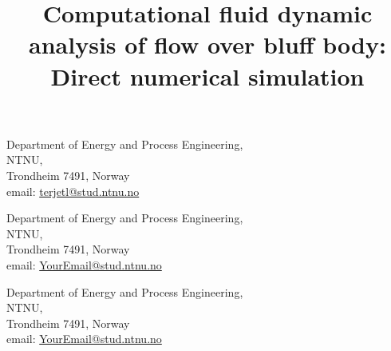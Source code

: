 \documentclass[subscriptcorrection,upint,varvw,mathalfa=cal=euler,barcolor=black,balance,hyphenate,french,pdf-a,nolists]{asmejour}
\begin{document}

	{Department of Energy and Process Engineering,\\
	NTNU,\\
	Trondheim 7491, Norway \\
	email: \href{mailto:terjetl@stud.ntnu.no}{terjetl@stud.ntnu.no}}

	{Department of Energy and Process Engineering,\\
	NTNU,\\
	Trondheim 7491, Norway \\
	email: \href{mailto:YourEmail@stud.ntnu.no}{YourEmail@stud.ntnu.no}}

	{Department of Energy and Process Engineering,\\
	NTNU,\\
	Trondheim 7491, Norway \\
	email: \href{mailto:YourEmail@stud.ntnu.no}{YourEmail@stud.ntnu.no}}


\title{Computational fluid dynamic analysis of flow over bluff body: Direct numerical simulation}

\end{document}
